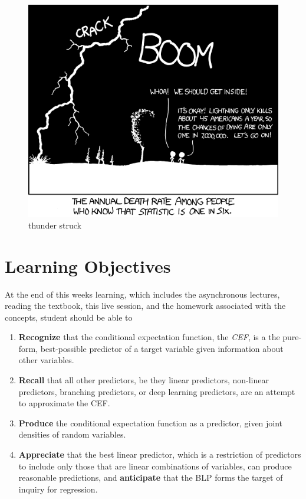 \documentclass[
]{book}
\providecommand{\tightlist}{%
  \setlength{\itemsep}{0pt}\setlength{\parskip}{0pt}}
\theoremstyle{definition}
\theoremstyle{definition}
\theoremstyle{definition}
\theoremstyle{definition}
\theoremstyle{remark}
\begin{document}
\begin{figure}
\centering
\includegraphics{./images/conditional_risk.png}
\caption{thunder struck}
\end{figure}

\hypertarget{learning-objectives-3}{%
\section{Learning Objectives}\label{learning-objectives-3}}

At the end of this weeks learning, which includes the asynchronous lectures, reading the textbook, this live session, and the homework associated with the concepts, student should be able to

\begin{enumerate}
\def\labelenumi{\arabic{enumi}.}
\tightlist
\item
  \textbf{Recognize} that the conditional expectation function, the \emph{CEF}, is a the pure-form, best-possible predictor of a target variable given information about other variables.
\item
  \textbf{Recall} that all other predictors, be they linear predictors, non-linear predictors, branching predictors, or deep learning predictors, are an attempt to approximate the CEF.
\item
  \textbf{Produce} the conditional expectation function as a predictor, given joint densities of random variables.
\item
  \textbf{Appreciate} that the best linear predictor, which is a restriction of predictors to include only those that are linear combinations of variables, can produce reasonable predictions, and \textbf{anticipate} that the BLP forms the target of inquiry for regression.
\end{enumerate}
\end{document}
